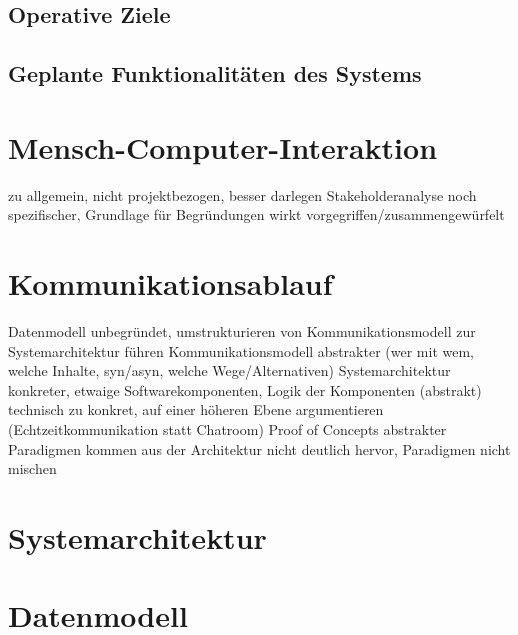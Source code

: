 \documentclass[12pt]{report}
\begin{document}
\section{Operative Ziele}

\section[Geplante Funktionalitäten]{Geplante Funktionalitäten des Systems}


\chapter{Mensch-Computer-Interaktion}

zu allgemein, nicht projektbezogen, besser darlegen
Stakeholderanalyse noch spezifischer, Grundlage für Begründungen
wirkt vorgegriffen/zusammengewürfelt


\chapter{Kommunikationsablauf}

Datenmodell unbegründet, umstrukturieren
von Kommunikationsmodell zur Systemarchitektur führen
Kommunikationsmodell abstrakter (wer mit wem, welche Inhalte, syn/asyn, welche Wege/Alternativen)
Systemarchitektur konkreter, etwaige Softwarekomponenten, Logik der Komponenten (abstrakt)
technisch zu konkret, auf einer höheren Ebene argumentieren (Echtzeitkommunikation statt Chatroom)
Proof of Concepts abstrakter
Paradigmen kommen aus der Architektur nicht deutlich hervor, Paradigmen nicht mischen


\chapter{Systemarchitektur}


\chapter{Datenmodell}
\end{document}
